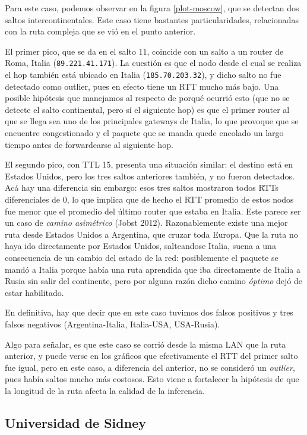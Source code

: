 Para este caso, podemos observar en la figura \ref{plot-moscow}, que se detectan dos saltos intercontinentales. Este caso tiene bastantes particularidades, relacionadas con la ruta compleja que se vió en el punto anterior. 

El primer pico, que se da en el salto 11, coincide con un salto a un router de Roma, Italia (\texttt{89.221.41.171}). La cuestión es que el nodo desde el cual se realiza el hop también está ubicado en Italia (\texttt{185.70.203.32}), y dicho salto no fue detectado como outlier, pues en efecto tiene un RTT mucho más bajo. Una posible hipótesis que manejamos al respecto de porqué ocurrió esto (que no se detecte el salto continental, pero sí el siguiente hop) es que el primer router al que se llega sea uno de los principales gateways de Italia, lo que provoque que se encuentre congestionado y el paquete que se manda quede encolado un largo tiempo antes de forwardearse al siguiente hop. 

El segundo pico, con TTL 15, presenta una situación similar: el destino está en Estados Unidos, pero los tres saltos anteriores también, y no fueron detectados. Acá hay una diferencia sin embargo: esos tres saltos mostraron todos RTTs diferenciales de 0, lo que implica que de hecho el RTT promedio de estos nodos fue menor que el promedio del último router que estaba en Italia. Este parece ser un caso de \textit{camino asimétrico} (Jobst 2012). Razonablemente existe una mejor ruta desde Estados Unidos a Argentina, que cruzar toda Europa. Que la ruta no haya ido directamente por Estados Unidos, salteandose Italia, suena a una consecuencia de un cambio del estado de la red: posiblemente el paquete se mandó a Italia porque había una ruta aprendida que iba directamente de Italia a Rusia sin salir del continente, pero por alguna razón dicho camino \emph{óptimo} dejó de estar habilitado.

En definitiva, hay que decir que en este caso tuvimos dos falsos positivos y tres falsos negativos (Argentina-Italia, Italia-USA, USA-Rusia). 

Algo para señalar, es que este caso se corrió desde la misma LAN que la ruta anterior, y puede verse en los gráficos que efectivamente el RTT del primer salto fue igual, pero en este caso, a diferencia del anterior, no se consideró un \emph{outlier}, pues había saltos mucho más costosos. Esto viene a fortalecer la hipótesis de que la longitud de la ruta afecta la calidad de la inferencia.

\subsection*{Universidad de Sidney}

